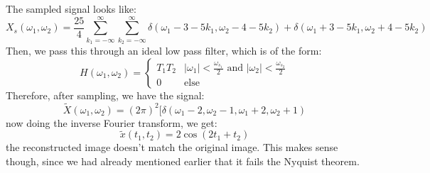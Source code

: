 \documentclass[10pt]{article}
\begin{document}
\begin{enumerate}[label=\alph*)]
			\begin{solution}
				The sampled signal looks like:
				\[
				X_s(\omega_1, \omega_2) = \frac{25}{4}\sum_{k_1=-\infty}^{\infty} \sum_{k_2=-\infty}^{\infty} 
				\delta(\omega_1 - 3 - 5k_1, \omega_2 - 4 - 5k_2) + \delta(\omega_1 + 3- 5k_1, \omega_2 + 4 - 5k_2)
				\] 
				Then, we pass this through an ideal low pass filter, which is of the form:
				\[
				H(\omega_1, \omega_2) = \begin{cases}
					T_1T_2 & |\omega_1| < \frac{\omega_{s_1}}{2} \text{ and } |\omega_2| < \frac{\omega_{s_2}}{2}\\
					0 & \text{else}
				\end{cases}
				\] 
				Therefore, after sampling, we have the signal:
				\[
				\tilde X(\omega_1, \omega_2) = (2\pi)^2[\delta(\omega_1 - 2, \omega_2 -1, \omega_1 + 2, \omega_2 + 1)
				\] 
				now doing the inverse Fourier transform, we get:
				\[
				\tilde x(t_1, t_2) = 2 \cos(2t_1+ t_2)
				\] 
				the reconstructed image doesn't match the original image. This makes sense though, since we had already
				mentioned earlier that it fails the Nyquist theorem.
			\end{solution}
	\end{enumerate}
\end{document}
